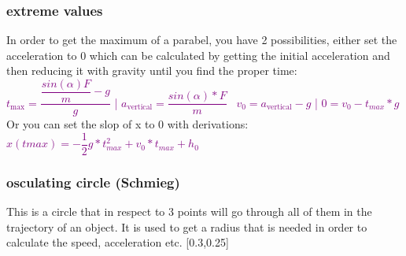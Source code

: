 \documentclass[main.tex,fontsize=8pt,paper=a4,paper=portrait,DIV=calc,]{scrartcl}
\begin{document}
\begin{multicols*}{2}
\subsubsection{extreme values}
In order to get the maximum of a parabel, you have 2 possibilities, either set the acceleration to 0 which can be calculated by getting the initial acceleration and then reducing it with gravity until you find the proper time:\newline
\, \newline
\Large \textcolor{purple}{\(t_{\text{max}} = \dfrac{\dfrac{sin(\alpha) F}{m} - g}{g}\) | \(a_{\text{vertical}} = \dfrac{sin(\alpha) * F}{m}\)}
\, \newline
\textcolor{purple}{\( v_0 = a_{\text{vertical}} - g \) | \( 0 = v_0 - t_{max} * g \)} 
\newline
Or you can set the slop of x to 0 with derivations:\newline
\, \newline
\large \textcolor{purple}{\( x(tmax) = -\dfrac{1}{2}g * t^2_{max} + v_0 * t_{max} + h_0\)}\newline
\, \newline

\subsubsection{osculating circle (Schmieg)}
This is a circle that in respect to 3 points will go through all of them in the trajectory of an object.\newline
It is used to get a radius that is needed in order to calculate the speed, acceleration etc.\newline
{}[0.3,0.25]


\end{multicols*}
\end{document}
